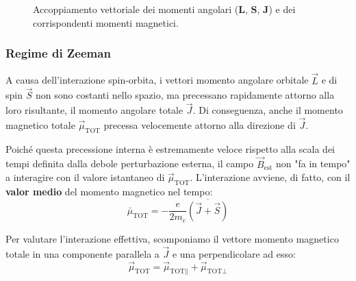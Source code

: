 \begin{figure}[htbp]
    \caption{Accoppiamento vettoriale dei momenti angolari (\(\mathbf{L}\), \(\mathbf{S}\), \(\mathbf{J}\)) e dei corrispondenti momenti magnetici.}
    \label{fig:vettori_momenti_magnetici}
\end{figure}

\subsubsection{Regime di Zeeman}
A causa dell'interazione spin-orbita, i vettori momento angolare orbitale \( \vec{L} \) e di spin \( \vec{S} \) non sono costanti nello spazio, ma precessano rapidamente attorno alla loro risultante, il momento angolare totale \( \vec{J} \). Di conseguenza, anche il momento magnetico totale \( \vec{\mu}_{\text{TOT}} \) precessa velocemente attorno alla direzione di \( \vec{J} \).

Poiché questa precessione interna è estremamente veloce rispetto alla scala dei tempi definita dalla debole perturbazione esterna, il campo \( \vec{B}_{\text{est}} \) non "fa in tempo" a interagire con il valore istantaneo di \( \vec{\mu}_{\text{TOT}} \). L'interazione avviene, di fatto, con il \textbf{valor medio} del momento magnetico nel tempo:
\begin{equation}
    \bar{\mu}_{\text{TOT}} = -\frac{e}{2m_e} \overline{(\vec{J} + \vec{S})}
\end{equation}

Per valutare l'interazione effettiva, scomponiamo il vettore momento magnetico totale in una componente parallela a \( \vec{J} \) e una perpendicolare ad esso:
\begin{equation}
    \vec{\mu}_{\text{TOT}} = \vec{\mu}_{\text{TOT}\parallel} + \vec{\mu}_{\text{TOT}\perp}
\end{equation}

